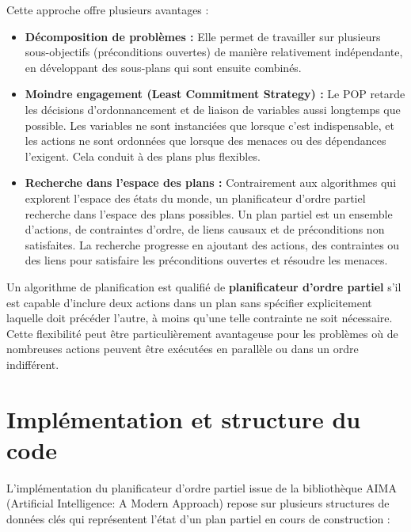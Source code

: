 \documentclass[a4paper,12pt]{report}
\begin{document}
Cette approche offre plusieurs avantages :
\begin{itemize}
    \item \textbf{Décomposition de problèmes :} Elle permet de travailler sur plusieurs sous-objectifs (préconditions ouvertes) de manière relativement indépendante, en développant des sous-plans qui sont ensuite combinés.
    \item \textbf{Moindre engagement (Least Commitment Strategy) :} Le POP retarde les décisions d'ordonnancement et de liaison de variables aussi longtemps que possible. Les variables ne sont instanciées que lorsque c'est indispensable, et les actions ne sont ordonnées que lorsque des menaces ou des dépendances l'exigent. Cela conduit à des plans plus flexibles.
    \item \textbf{Recherche dans l'espace des plans :} Contrairement aux algorithmes qui explorent l'espace des états du monde, un planificateur d'ordre partiel recherche dans l'espace des plans possibles. Un plan partiel est un ensemble d'actions, de contraintes d'ordre, de liens causaux et de préconditions non satisfaites. La recherche progresse en ajoutant des actions, des contraintes ou des liens pour satisfaire les préconditions ouvertes et résoudre les menaces.
\end{itemize}
Un algorithme de planification est qualifié de \textbf{planificateur d'ordre partiel} s'il est capable d'inclure deux actions dans un plan sans spécifier explicitement laquelle doit précéder l'autre, à moins qu'une telle contrainte ne soit nécessaire. Cette flexibilité peut être particulièrement avantageuse pour les problèmes où de nombreuses actions peuvent être exécutées en parallèle ou dans un ordre indifférent.

\section{Implémentation et structure du code}
L'implémentation du planificateur d'ordre partiel issue de la bibliothèque AIMA (Artificial Intelligence: A Modern Approach) repose sur plusieurs structures de données clés qui représentent l'état d'un plan partiel en cours de construction :
\end{document}
